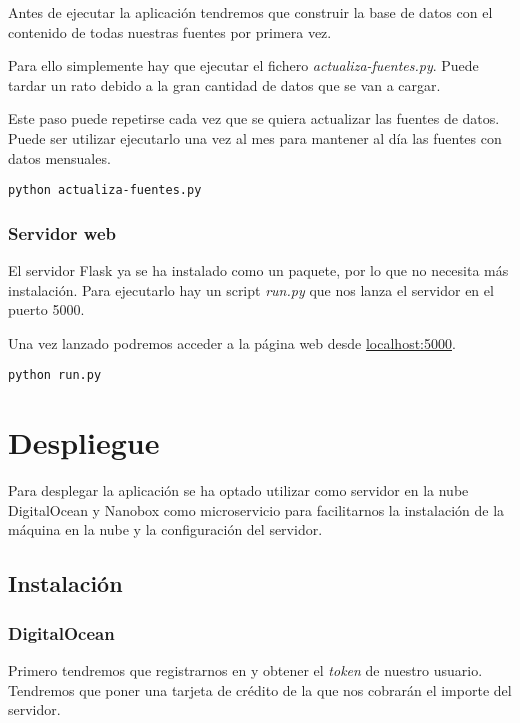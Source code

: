 Antes de ejecutar la aplicación tendremos que construir la base de datos con el contenido de todas nuestras fuentes por primera vez.

Para ello simplemente hay que ejecutar el fichero \textit{actualiza-fuentes.py}. Puede tardar un rato debido a la gran cantidad de datos que se van a cargar.

Este paso puede repetirse cada vez que se quiera actualizar las fuentes de datos. Puede ser utilizar ejecutarlo una vez al mes para mantener al día las fuentes con datos mensuales.

\begin{lstlisting}
python actualiza-fuentes.py
\end{lstlisting}

\subsubsection{Servidor web}

El servidor Flask ya se ha instalado como un paquete, por lo que no necesita más instalación.
Para ejecutarlo hay un script \textit{run.py} que nos lanza el servidor en el puerto 5000.

Una vez lanzado podremos acceder a la página web desde \href{http://localhost:5000}{localhost:5000}.

\begin{lstlisting}
python run.py
\end{lstlisting}

\section{Despliegue}

Para desplegar la aplicación se ha optado utilizar como servidor en la nube DigitalOcean y Nanobox como microservicio para facilitarnos la instalación de la máquina en la nube y la configuración del servidor.

\subsection{Instalación}

\subsubsection{DigitalOcean}

Primero tendremos que registrarnos en  y obtener el \textit{token} de nuestro usuario. Tendremos que poner una tarjeta de crédito de la que nos cobrarán el importe del servidor.

